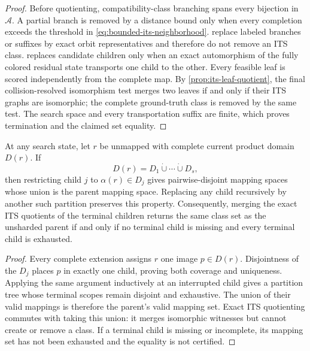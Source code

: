 \begin{proof}
Before quotienting, compatibility-class branching spans every bijection in
$\mathcal A$.  A partial branch is removed by a distance bound only when every
completion exceeds the threshold in \cref{eq:bounded-its-neighborhood}.
replace labeled branches or suffixes by exact orbit representatives and
therefore do not remove an ITS class.
 replaces candidate children only when an
exact automorphism of the fully colored residual state transports one child
to the other.
Every feasible leaf is scored independently from the complete map.
By \cref{prop:its-leaf-quotient}, the final collision-resolved isomorphism test
merges two leaves if and only if their ITS graphs are isomorphic; the complete
ground-truth class is removed by the same test.  The search space and every
transportation suffix are finite, which proves termination and the claimed
set equality.
\end{proof}

\begin{proposition}
\label{prop:exact-search-sharding}
At any search state, let $r$ be unmapped with complete current product domain
$D(r)$.  If
\[
  D(r)=D_1\mathbin{\dot\cup}\cdots\mathbin{\dot\cup}D_s,
\]
then restricting child $j$ to $\alpha(r)\in D_j$ gives pairwise-disjoint
mapping spaces whose union is the parent mapping space.  Replacing any child
recursively by another such partition preserves this property.  Consequently,
merging the exact ITS quotients of the terminal children returns the same
class set as the unsharded parent if and only if no terminal child is missing
and every terminal child is exhausted.
\end{proposition}

\begin{proof}
Every complete extension assigns $r$ one image $p\in D(r)$.  Disjointness of
the $D_j$ places $p$ in exactly one child, proving both coverage and
uniqueness.  Applying the same argument inductively at an interrupted child
gives a partition tree whose terminal scopes remain disjoint and exhaustive.
The union of their valid mappings is therefore the parent's valid mapping
set.  Exact ITS quotienting commutes with taking this union: it merges
isomorphic witnesses but cannot create or remove a class.  If a terminal
child is missing or incomplete, its mapping set has not been exhausted and
the equality is not certified.
\end{proof}

